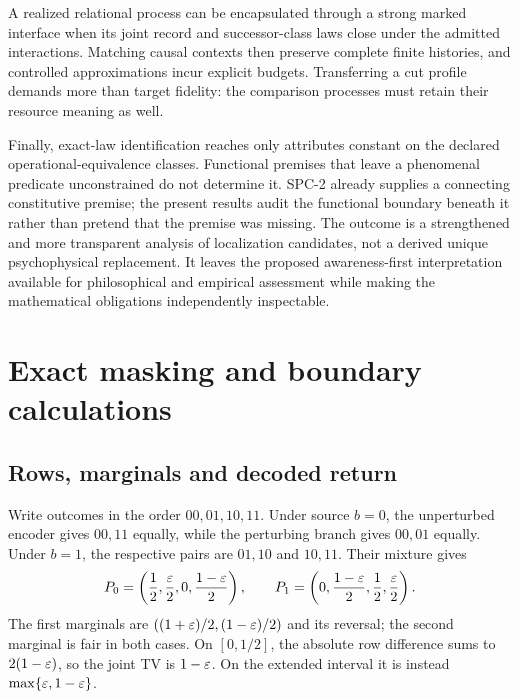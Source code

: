 A realized relational process can be encapsulated through a strong marked interface when its joint record and successor-class laws close under the admitted interactions. Matching causal contexts then preserve complete finite histories, and controlled approximations incur explicit budgets. Transferring a cut profile demands more than target fidelity: the comparison processes must retain their resource meaning as well.

Finally, exact-law identification reaches only attributes constant on the declared operational-equivalence classes. Functional premises that leave a phenomenal predicate unconstrained do not determine it. SPC-2 already supplies a connecting constitutive premise; the present results audit the functional boundary beneath it rather than pretend that the premise was missing. The outcome is a strengthened and more transparent analysis of localization candidates, not a derived unique psychophysical replacement. It leaves the proposed awareness-first interpretation available for philosophical and empirical assessment while making the mathematical obligations independently inspectable.


\appendix

\section{Exact masking and boundary calculations}\label{app:masking}
\subsection{Rows, marginals and decoded return}
Write outcomes in the order \(00,01,10,11\). Under source \(b=0\), the unperturbed encoder gives \(00,11\) equally, while the perturbing branch gives \(00,01\) equally. Under \(b=1\), the respective pairs are \(01,10\) and \(10,11\). Their mixture gives
\begin{equation}\label{eq:appendix-rows}
 P_0=\left(\frac12,\frac{\varepsilon}2,0,\frac{1-\varepsilon}2\right),\qquad
 P_1=\left(0,\frac{1-\varepsilon}2,\frac12,\frac{\varepsilon}2\right).
\end{equation}
The first marginals are \(((1+\varepsilon)/2,(1-\varepsilon)/2)\) and its reversal; the second marginal is fair in both cases. On \([0,1/2]\), the absolute row difference sums to \(2(1-\varepsilon)\), so the joint TV is \(1-\varepsilon\). On the extended interval it is instead \(\max\{\varepsilon,1-\varepsilon\}\).

